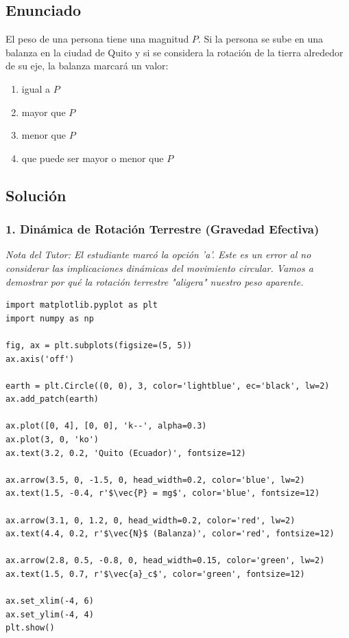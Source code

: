 \documentclass[12pt, a4paper]{article}
\begin{document}
\newpage

\subsection*{Enunciado}
El peso de una persona tiene una magnitud $P$. Si la persona se sube en una balanza en la ciudad de Quito y si se considera la rotación de la tierra alrededor de su eje, la balanza marcará un valor:
\begin{enumerate}[label=\alph*)]
    \item igual a $P$
    \item mayor que $P$
    \item menor que $P$
    \item que puede ser mayor o menor que $P$
\end{enumerate}

\subsection*{Solución}

\subsubsection*{1. Dinámica de Rotación Terrestre (Gravedad Efectiva)}
\textit{Nota del Tutor: El estudiante marcó la opción 'a'. Este es un error al no considerar las implicaciones dinámicas del movimiento circular. Vamos a demostrar por qué la rotación terrestre "aligera" nuestro peso aparente.}

\begin{verbatim}
import matplotlib.pyplot as plt
import numpy as np

fig, ax = plt.subplots(figsize=(5, 5))
ax.axis('off')

earth = plt.Circle((0, 0), 3, color='lightblue', ec='black', lw=2)
ax.add_patch(earth)

ax.plot([0, 4], [0, 0], 'k--', alpha=0.3)
ax.plot(3, 0, 'ko')
ax.text(3.2, 0.2, 'Quito (Ecuador)', fontsize=12)

ax.arrow(3.5, 0, -1.5, 0, head_width=0.2, color='blue', lw=2)
ax.text(1.5, -0.4, r'$\vec{P} = mg$', color='blue', fontsize=12)

ax.arrow(3.1, 0, 1.2, 0, head_width=0.2, color='red', lw=2)
ax.text(4.4, 0.2, r'$\vec{N}$ (Balanza)', color='red', fontsize=12)

ax.arrow(2.8, 0.5, -0.8, 0, head_width=0.15, color='green', lw=2)
ax.text(1.5, 0.7, r'$\vec{a}_c$', color='green', fontsize=12)

ax.set_xlim(-4, 6)
ax.set_ylim(-4, 4)
plt.show()
\end{verbatim}
\end{document}
